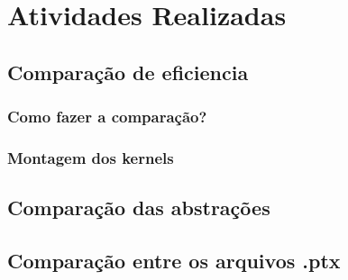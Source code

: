 \section{Atividades Realizadas}
\subsection{Comparação de eficiencia}
\subsubsection{Como fazer a comparação?}
\subsubsection{Montagem dos kernels}
\subsection{Comparação das abstrações}
\subsection{Comparação entre os arquivos .ptx}
